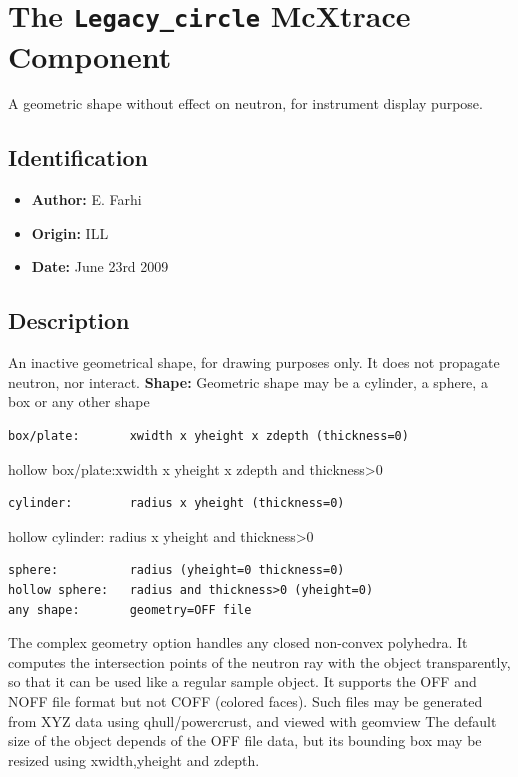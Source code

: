 \section{The \texttt{Legacy\_circle} McXtrace Component}
A geometric shape without effect on neutron, for instrument display purpose.

\subsection*{Identification}
\begin{itemize}
  \item \textbf{Author:} E. Farhi
  \item \textbf{Origin:} ILL
  \item \textbf{Date:} June 23rd 2009
\end{itemize}

\subsection*{Description}
An inactive geometrical shape, for drawing purposes only. It does not propagate neutron, nor interact. \textbf{Shape:} Geometric shape may be a cylinder, a sphere, a box or any other shape

\begin{verbatim}
box/plate:       xwidth x yheight x zdepth (thickness=0)
\end{verbatim}

hollow box/plate:xwidth x yheight x zdepth and thickness\textgreater{}0

\begin{verbatim}
cylinder:        radius x yheight (thickness=0)
\end{verbatim}

hollow cylinder: radius x yheight and thickness\textgreater{}0

\begin{verbatim}
sphere:          radius (yheight=0 thickness=0)
hollow sphere:   radius and thickness>0 (yheight=0)
any shape:       geometry=OFF file
\end{verbatim}

The complex geometry option handles any closed non-convex polyhedra. It computes the intersection points of the neutron ray with the object transparently, so that it can be used like a regular sample object. It supports the OFF and NOFF file format but not COFF (colored faces). Such files may be generated from XYZ data using qhull/powercrust, and viewed with geomview The default size of the object depends of the OFF file data, but its bounding box may be resized using xwidth,yheight and zdepth.


